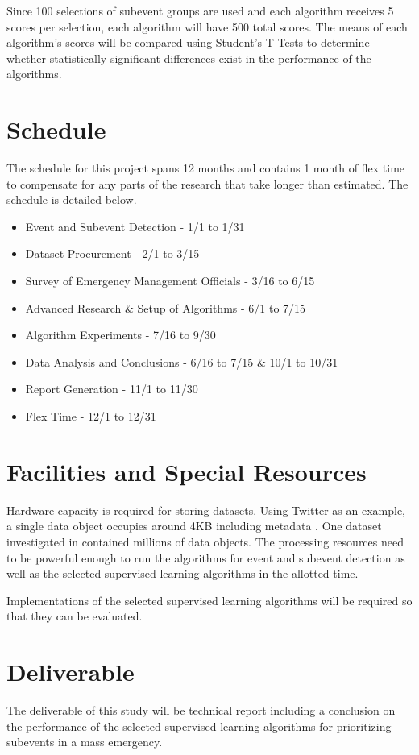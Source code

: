 \documentclass[conference]{IEEEtran}
\begin{document}
Since 100 selections of subevent groups are used and each algorithm receives 5 scores per selection, each algorithm will have 500 total scores. The means of each algorithm's scores will be compared using Student's T-Tests to determine whether statistically significant differences exist in the performance of the algorithms.

\section{Schedule}
The schedule for this project spans 12 months and contains 1 month of flex time to compensate for any parts of the research that take longer than estimated. The schedule is detailed below.
\begin{itemize}
	\item Event and Subevent Detection - 1/1 to 1/31  
	\item Dataset Procurement - 2/1 to 3/15  
	\item Survey of Emergency Management Officials - 3/16 to 6/15  
	\item Advanced Research \& Setup of Algorithms - 6/1 to 7/15 
	\item Algorithm Experiments - 7/16 to 9/30 
	\item Data Analysis and Conclusions - 6/16 to 7/15 \& 10/1 to 10/31 
	\item Report Generation - 11/1 to 11/30 
	\item Flex Time - 12/1 to 12/31 
\end{itemize}	


\section{Facilities and Special Resources}
Hardware capacity is required for storing datasets. Using Twitter as an example, a single data object occupies around 4KB including metadata \cite{Imran}. One dataset investigated in \cite{vieweg2014} contained millions of data objects. The processing resources need to be powerful enough to run the algorithms for event and subevent detection as well as the selected supervised learning algorithms in the allotted time.

Implementations of the selected supervised learning algorithms will be required so that they can be evaluated.


\section{Deliverable}
The deliverable of this study will be technical report including a conclusion on the performance of the selected supervised learning algorithms for prioritizing subevents in a mass emergency.









\end{document}
